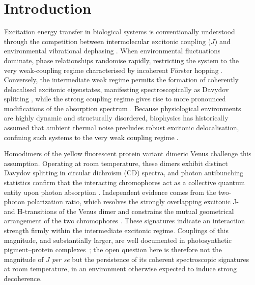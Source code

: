 \documentclass[journal=jpcbfk, manuscript=article, layout=twocolumn, doi=true]{achemso}
\begin{document}
\section{Introduction}
Excitation energy transfer in biological systems is conventionally understood through the competition between intermolecular excitonic coupling ($J$) and environmental vibrational dephasing \cite{forster1965delocalized, may2004charge}. When environmental fluctuations dominate, phase relationships randomise rapidly, restricting the system to the very weak-coupling regime characterised by incoherent Förster hopping \cite{forster1948intermolecular}. Conversely, the intermediate weak regime permits the formation of coherently delocalised excitonic eigenstates, manifesting spectroscopically as Davydov splitting \cite{davydov1971}, while the strong coupling regime gives rise to more pronounced modifications of the absorption spectrum \cite{clegg2006history}. Because physiological environments are highly dynamic and structurally disordered, biophysics has historically assumed that ambient thermal noise precludes robust excitonic delocalisation, confining such systems to the very weak coupling regime \cite{clegg2006history, nelson2018role}.

Homodimers of the yellow fluorescent protein variant dimeric Venus challenge this assumption. Operating at room temperature, these dimers exhibit distinct Davydov splitting in circular dichroism (CD) spectra, and photon antibunching statistics confirm that the interacting chromophores act as a collective quantum entity upon photon absorption \cite{kim2019venusa206, freed2025effect}. Independent evidence comes from the two-photon polarization ratio, which resolves the strongly overlapping excitonic J- and H-transitions of the Venus dimer and constrains the mutual geometrical arrangement of the two chromophores \cite{cusick2026polarization}. These signatures indicate an interaction strength firmly within the intermediate excitonic regime. {Couplings of this magnitude, and substantially larger, are well documented in photosynthetic pigment--protein complexes~\cite{scholes2003, van2000photosynthetic, ishizaki2009unified}; the open question here is therefore not the magnitude of $J$ \emph{per se} but the persistence of its coherent spectroscopic signatures at room temperature, in an environment otherwise expected to induce strong decoherence.}
\end{document}
